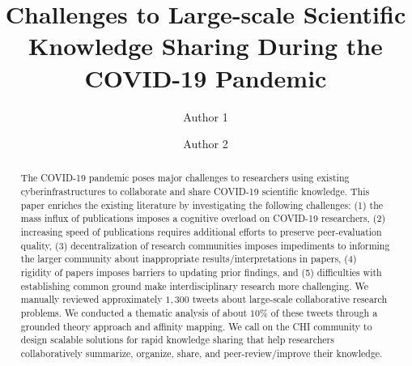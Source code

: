 \documentclass[acmsmall,authordraft]{acmart}
\begin{document}
\title[Scientific Knowledge Sharing at Scale During Pandemic]{Challenges to Large-scale Scientific Knowledge Sharing During the COVID-19 Pandemic}

\author{Author 1}

\author{Author 2}


\renewcommand{\shortauthors}{Author 1, et al.}

\begin{abstract}
The COVID-19 pandemic poses major challenges to researchers using existing cyberinfrastructures to collaborate and share COVID-19 scientific knowledge. This paper enriches the existing literature by investigating the following challenges: (1) the mass influx of publications imposes a cognitive overload on COVID-19 researchers, (2) increasing speed of publications requires additional efforts to preserve peer-evaluation quality, (3) decentralization of research communities imposes impediments to informing the larger community about inappropriate results/interpretations in papers, (4) rigidity of papers imposes barriers to updating prior findings, and (5) difficulties with establishing common ground make interdisciplinary research more challenging. We manually reviewed approximately $1,300$ tweets about large-scale collaborative research problems. We conducted a thematic analysis of about $10\%$ of these tweets through a grounded theory approach and affinity mapping. We call on the CHI community to design scalable solutions for rapid knowledge sharing that help researchers collaboratively summarize, organize, share, and peer-review/improve their knowledge.
\end{abstract}
\end{document}
